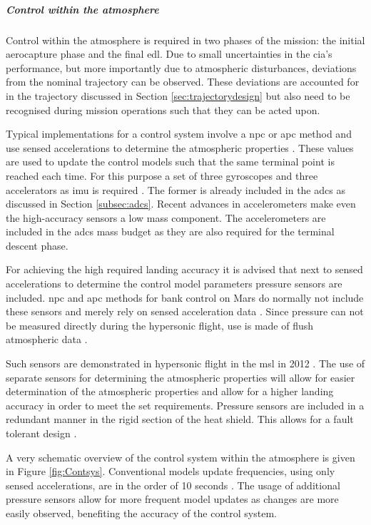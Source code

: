 \subparagraph{Control within the atmosphere}
Control within the atmosphere is required in two phases of the mission: the initial aerocapture phase and the final \gls{edl}. Due to small uncertainties in the \gls{cia}'s performance, but more importantly due to atmospheric disturbances, deviations from the nominal trajectory can be observed. These deviations are accounted for in the trajectory discussed in Section \ref{sec:trajectorydesign} but also need to be recognised during mission operations such that they can be acted upon. 

Typical implementations for a control system involve a \gls{npc} or \gls{apc} method and use sensed accelerations to determine the atmospheric properties \cite{Davis2010}. These values are used to update the control models such that the same terminal point is reached each time. For this purpose a set of three gyroscopes and three accelerators as \gls{imu} is required \cite{Dutta2013}. The former is already included in the \gls{adcs} as discussed in Section \ref{subsec:adcs}. Recent advances in accelerometers make even the high-accuracy sensors a low mass component. The accelerometers are included in the \gls{adcs} mass budget as they are also required for the terminal descent phase. 

For achieving the high required landing accuracy it is advised that next to sensed accelerations to determine the control model parameters pressure sensors are included.  \gls{npc} and \gls{apc} methods for bank control on Mars do normally not include these sensors and merely rely on sensed acceleration data \cite{Lu2007, Davis2010}. Since pressure can not be measured directly during the hypersonic flight, use is made of flush atmospheric data \cite{Dutta2013}. 
 
Such sensors are demonstrated in hypersonic flight in the \gls{msl} in 2012 \cite{Dutta2013}. The use of separate sensors for determining the atmospheric properties will allow for easier determination of the atmospheric properties and allow for a higher landing accuracy in order to meet the set requirements.
Pressure sensors are included in a redundant manner in the rigid section of the heat shield. This allows for a fault tolerant design \cite{Whitmore1995}. 

A very schematic overview of the control system within the atmosphere is given in Figure \ref{fig:Contsys}. Conventional models update frequencies, using only sensed accelerations, are in the order of 10 seconds \cite{Davis2010}. The usage of additional pressure sensors allow for more frequent model updates as changes are more easily observed, benefiting the accuracy of the control system.

